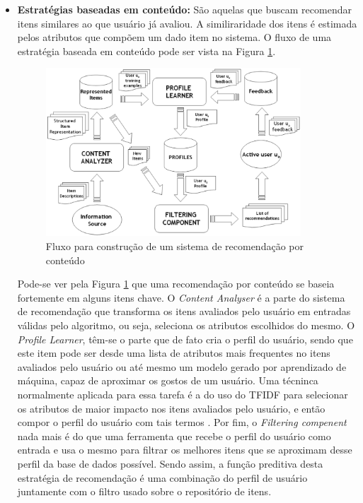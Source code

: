\begin{itemize}
    \item \textbf{Estratégias baseadas em conteúdo: } São aquelas que buscam
        recomendar itens similares ao que usuário já avaliou. A similiraridade
        dos itens é estimada pelos atributos que compõem um dado item no
        sistema. O fluxo de uma estratégia baseada em conteúdo pode ser vista na
        Figura \ref{fig:recomendacao_conteudo}.

        \begin{figure}[h]
            \centering
            \includegraphics[width=0.9\textwidth]{figuras/recomendacao_conteudo}
            \caption{Fluxo para construção de um sistema de recomendação por
            conteúdo \cite{lops2011content}}
            \label{fig:recomendacao_conteudo}
        \end{figure}

        Pode-se ver pela Figura \ref{fig:recomendacao_conteudo} que uma recomendação
        por conteúdo se baseia fortemente em alguns itens chave. O
        \textit{Content Analyser} é a parte do sistema de recomendação que
        transforma os itens avaliados pelo usuário em entradas válidas pelo
        algoritmo, ou seja, seleciona os atributos escolhidos do mesmo. O
        \textit{Profile Learner}, têm-se o parte que de fato cria o perfil do
        usuário, sendo que este item pode ser desde uma lista de atributos mais
        frequentes no itens avaliados pelo usuário ou até mesmo um modelo gerado
        por aprendizado de máquina, capaz de aproximar os gostos de um usuário.
        Uma técninca normalmente aplicada para essa tarefa é a do uso do TFIDF
        para selecionar os atributos de maior impacto nos itens avaliados pelo
        usuário, e então compor o perfil do usuário com tais termos
        \cite{lops2011content}. Por fim, o \textit{Filtering compenent} nada mais é do que uma
        ferramenta que recebe o perfil do usuário como entrada e usa o mesmo
        para filtrar os melhores itens que se aproximam desse perfil da base de
        dados possível. Sendo assim, a função preditiva desta estratégia de
        recomendação é uma combinação do perfil de usuário juntamente com o
        filtro usado sobre o repositório de itens.


\end{itemize}
